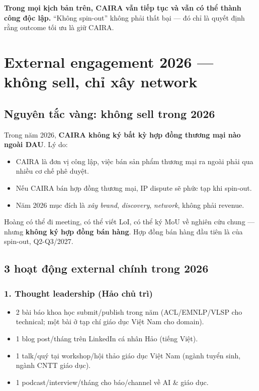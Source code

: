 \documentclass[11pt,a4paper]{article}
\begin{document}
\textbf{Trong mọi kịch bản trên, CAIRA vẫn tiếp tục và vẫn có thể thành công
độc lập.} ``Không spin-out'' không phải thất bại --- đó chỉ là quyết định rằng
outcome tối ưu là giữ CAIRA.

\clearpage

\section{External engagement 2026 — không sell, chỉ xây network}

\subsection{Nguyên tắc vàng: không sell trong 2026}

Trong năm 2026, \textbf{CAIRA không ký bất kỳ hợp đồng thương mại nào ngoài
DAU}. Lý do:

\begin{itemize}
\item CAIRA là đơn vị công lập, việc bán sản phẩm thương mại ra ngoài phải qua nhiều cơ chế phê duyệt.
\item Nếu CAIRA bán hợp đồng thương mại, IP dispute sẽ phức tạp khi spin-out.
\item Năm 2026 mục đích là \textit{xây brand}, \textit{discovery}, \textit{network}, không phải revenue.
\end{itemize}

Hoàng có thể đi meeting, có thể viết LoI, có thể ký MoU về nghiên cứu chung —
nhưng \textbf{không ký hợp đồng bán hàng}. Hợp đồng bán hàng đầu tiên là của spin-out, Q2-Q3/2027.

\subsection{3 hoạt động external chính trong 2026}

\subsubsection*{1. Thought leadership (Hảo chủ trì)}

\begin{itemize}
\item 2 bài báo khoa học submit/publish trong năm (ACL/EMNLP/VLSP cho technical; một bài ở tạp chí giáo dục Việt Nam cho domain).
\item 1 blog post/tháng trên LinkedIn cá nhân Hảo (tiếng Việt).
\item 1 talk/quý tại workshop/hội thảo giáo dục Việt Nam (ngành tuyển sinh, ngành CNTT giáo dục).
\item 1 podcast/interview/tháng cho báo/channel về AI \& giáo dục.
\end{itemize}
\end{document}
